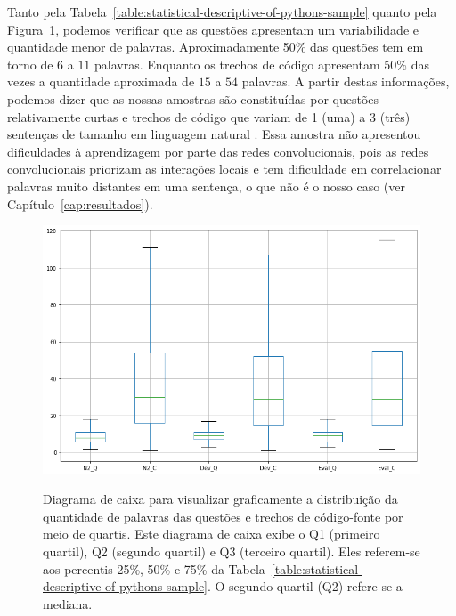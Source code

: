 Tanto pela Tabela~\ref{table:statistical-descriptive-of-pythons-sample} quanto pela Figura~\ref{fig:boxplot-number-of-words}, podemos verificar que as questões apresentam um variabilidade e quantidade menor de palavras. Aproximadamente 50\% das questões tem em torno de $6$ a $11$ palavras. Enquanto os trechos de código apresentam 50\% das vezes a quantidade aproximada de $15$ a $54$ palavras. A partir destas informações, podemos dizer que as nossas amostras são constituídas por questões relativamente curtas e trechos de código que variam de 1 (uma) a 3 (três) sentenças de tamanho em linguagem natural \cite{casi-newell-sentence-length-2018}. Essa amostra não apresentou dificuldades à aprendizagem por parte das redes convolucionais, pois as redes convolucionais priorizam as interações locais e tem dificuldade em correlacionar palavras muito distantes em uma sentença, o que não é o nosso caso (ver Capítulo~\ref{cap:resultados}).



\begin{figure}[h]
\centering
\caption[Diagrama de caixa para visualizar graficamente a distribuição da quantidade de palavras das questões e trechos de código-fonte por meio de quartis.]{Diagrama de caixa para visualizar graficamente a distribuição da quantidade de palavras das questões e trechos de código-fonte por meio de quartis. Este diagrama de caixa exibe o Q1 (primeiro quartil), Q2 (segundo quartil) e Q3 (terceiro quartil). Eles referem-se aos percentis 25\%, 50\% e 75\% da Tabela~\ref{table:statistical-descriptive-of-pythons-sample}. O segundo quartil (Q2) refere-se a mediana. }
\includegraphics[width=1\textwidth]{figuras/cap-experimento/boxplot_number_of_words.png}
\label{fig:boxplot-number-of-words}
\end{figure}

